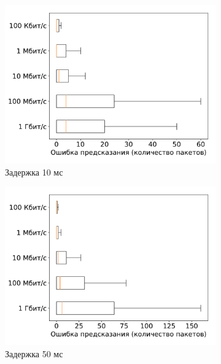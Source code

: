 \documentclass[../thesis.tex]{subfiles}
\begin{document}
\begin{figure}
\begin{subfigure}[b]{0.49\textwidth}
  \centering
  \includegraphics[width=1.0\textwidth]{figures/experiments/packet_error_50.pdf}
  \caption{Задержка 10 мс} \label{fig:prediction_error_10}
\end{subfigure}
\begin{subfigure}[b]{0.49\textwidth}
  \centering
  \includegraphics[width=1.0\textwidth]{figures/experiments/packet_error_100.pdf}
  \caption{Задержка 50 мс} \label{fig:prediction_error_50}
\end{subfigure}
\begin{subfigure}[b]{0.49\textwidth}
  \centering

\end{subfigure}
\end{figure}
\end{document}
